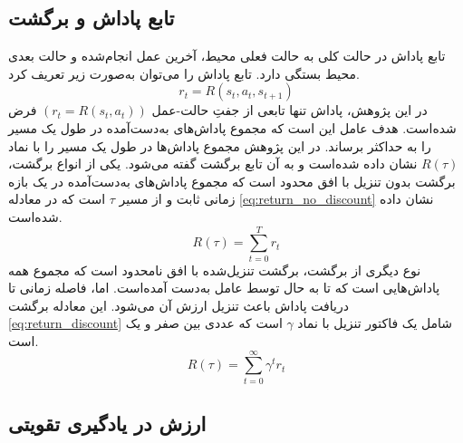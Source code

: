\subsection{تابع پاداش و برگشت}
تابع پاداش در حالت کلی به حالت فعلی محیط، آخرین عمل انجام‌شده و حالت بعدی محیط بستگی دارد. تابع پاداش را می‌توان به‌صورت زیر تعریف کرد.
\begin{equation}
	r_t = R(s_t, a_t, s_{t+1})
\end{equation}
در این پژوهش، پاداش تنها تابعی از جفتِ حالت-عمل \((r_t = R(s_t, a_t))\) فرض شده‌است.
هدف عامل این است که مجموع پاداش‌های به‌دست‌آمده در طول یک مسیر را به حداکثر برساند. در این پژوهش مجموع پاداش‌ها در طول یک مسیر را با نماد \(R(\tau)\) نشان داده‌ شده‌است و به آن تابع برگشت
 گفته می‌شود.
یکی از انواع برگشت، برگشت بدون تنزیل با افق محدود
 است که مجموع پاداش‌های به‌دست‌آمده در یک بازه زمانی ثابت و از مسیر
 \(\tau\)
  است که در معادله 
  \eqref{eq:return_no_discount}
  نشان داده شده‌است.
 \begin{equation}
 	R(\tau) = \sum_{t = 0}^T r_t
 	\label{eq:return_no_discount}
 \end{equation}
نوع دیگری از برگشت، برگشت تنزیل‌شده با افق نامحدود
 است که مجموع همه پاداش‌هایی است که تا به حال توسط عامل به‌دست آمده‌است. اما، فاصله زمانی تا دریافت پاداش باعث تنزیل ارزش آن می‌شود. این معادله برگشت \eqref{eq:return_discount} شامل یک فاکتور تنزیل
   با نماد \(\gamma\) است که
   عددی بین صفر و یک است.
    \begin{equation}
   	R(\tau) = \sum_{t = 0}^{\infty} \gamma^t r_t
   	\label{eq:return_discount}
   \end{equation}
   
   
   
 \subsection{ ارزش در یادگیری تقویتی}
   
